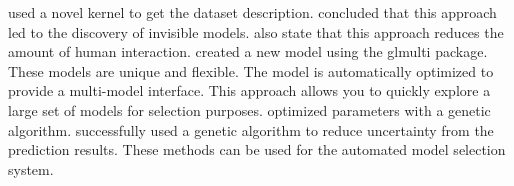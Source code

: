 \cite*{17_rp} used a novel kernel to get the dataset description. \citeauthor{17_rp} concluded that this approach led to the discovery of invisible models. \citeauthor{17_rp} also state that this approach reduces the amount of human interaction. \cite*{04_rp} created a new model using the glmulti package. These models are unique and flexible. The model is automatically optimized to provide a multi-model interface. This approach allows you to quickly explore a large set of models for selection purposes. \cite*{08_rp} optimized parameters with a genetic algorithm. \citeauthor{08_rp} successfully used a genetic algorithm to reduce uncertainty from the prediction results. These methods can be used for the automated model selection system.

